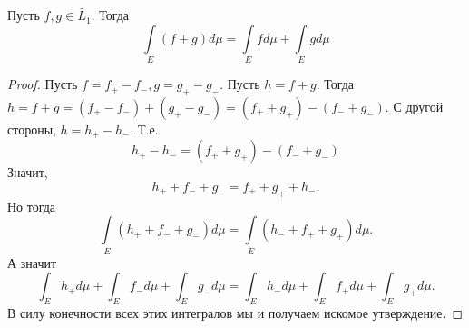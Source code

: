 \begin{proposition}
    Пусть $f, g \in \widetilde{L_1}$. Тогда \[\int\limits_E (f + g)d\mu = \int\limits_E fd\mu + \int\limits_E gd\mu\]
\end{proposition}
\begin{proof}
    Пусть $f = f_+ - f_-, g = g_+ - g_-$. Пусть $h = f + g$. Тогда $h = f + g = (f_+ - f_-) + (g_+ - g_-) = (f_+ + g_+) - (f_- + g_-)$. С другой стороны, $h = h_+ - h_-$. Т.е. \[h_+ - h_- = (f_+ + g_+) - (f_- + g_-)\]
    Значит, \[h_+ + f_- + g_- = f_+ + g_+ + h_-.\]
    Но тогда \[\int\limits_E (h_+ + f_- + g_-)d\mu = \int\limits_E (h_- + f_+ + g_+)d\mu.\]
    А значит \[\int_E h_+d\mu + \int_E f_-d\mu + \int_E g_-d\mu = \int_E h_-d\mu + \int_E f_+d\mu + \int_E g_+d\mu.\]
    В силу конечности всех этих интегралов мы и получаем искомое утверждение.
\end{proof}


